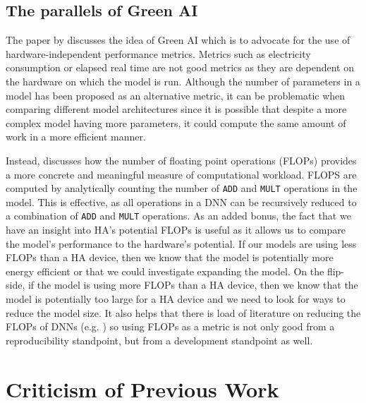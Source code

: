 \documentclass[logo,bsc,singlespacing,parskip,online]{infthesis}
\begin{document}

\subsection{The parallels of Green AI}
The paper by \citet{schwartz2019greenai} discusses the idea of Green AI 
which is to advocate for the use of hardware-independent performance metrics.
Metrics such as electricity consumption or elapsed real time are not good metrics 
as they are dependent on the hardware on which the model is run. 
Although the number of parameters in a model has been proposed as an 
alternative metric, it can be problematic when comparing different model architectures 
since it is possible that despite a more complex model having more parameters, 
it could compute the same amount of work in a more efficient manner. 

Instead, \citet{schwartz2019greenai} discusses how the number of floating point operations (FLOPs)
provides a more concrete and meaningful measure of computational workload. 
FLOPS are computed by analytically counting the number of \texttt{ADD} and \texttt{MULT} operations in the model.
This is effective, as all operations in a DNN can be recursively reduced to a combination 
of \texttt{ADD} and \texttt{MULT} operations.
As an added bonus, the fact that we have an insight into HA's potential FLOPs is useful 
as it allows us to compare the model's performance to the hardware's potential. If our 
models are using less FLOPs than a HA device, then we know that the model is 
potentially more energy efficient or that we could investigate expanding 
the model. On the flip-side, if the model is using more FLOPs than a HA device, 
then we know that the model is potentially too large for a HA device and we need 
to look for ways to reduce the model size. It also helps that there is load 
of literature on reducing the FLOPs of DNNs (e.g. \cite{liu_simple_2023}) so 
using FLOPs as a metric is not only good from a reproducibility standpoint, 
but from a development standpoint as well. 

\section{Criticism of Previous Work}
\end{document}
